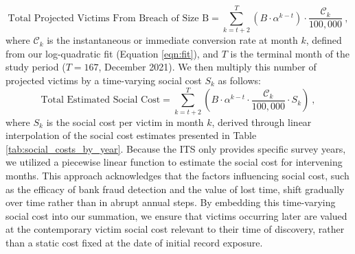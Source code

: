 \begin{equation}
    \text{Total Projected Victims From Breach of Size B} = \sum_{k=t+2}^{T} (B \cdot \alpha^{k-t}) \cdot \frac{\mathcal{C}_k}{100,000}~, 
\end{equation}
where $\mathcal{C}_k$ is the instantaneous or immediate conversion rate at month $k$, defined from our log-quadratic fit (Equation \ref{eqn:fit}), and $T$ is the terminal month of the study period ($T=167$, December 2021). 
We then multiply this number of projected victims by a time-varying social cost $S_k$ as follows:
%
\begin{equation}
\label{eq:social_cost_breach_upper}
\text{Total Estimated Social Cost} = \sum_{k=t+2}^{T} \left( B \cdot \alpha^{k-t} \cdot \frac{\mathcal{C}_k}{100,000} \cdot S_k \right)~, 
\end{equation}
where $S_k$ is the social cost per victim in month $k$, derived through linear interpolation of the social cost estimates presented in Table \ref{tab:social_costs_by_year}. Because the ITS only provides specific survey years, we utilized a piecewise linear function to estimate the social cost for intervening months. This approach acknowledges that the factors influencing social cost, such as the efficacy of bank fraud detection and the value of lost time, shift gradually over time rather than in abrupt annual steps. By embedding this time-varying social cost into our summation, we ensure that victims occurring later are valued at the contemporary victim social cost relevant to their time of discovery, rather than a static cost fixed at the date of initial record exposure. 


